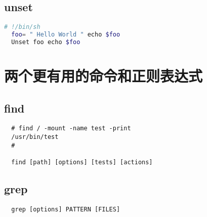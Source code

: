 \documentclass[a4paper]{ctexart}
\begin{document}
\subsection{unset}
\begin{lstlisting}[language=sh]
  # !/bin/sh 
  foo= " Hello World " echo $foo 
  Unset foo echo $foo   
\end{lstlisting}

\section{两个更有用的命令和正则表达式}
\subsection{find}
\begin{lstlisting}
  # find / -mount -name test -print
  /usr/bin/test
  #

  find [path] [options] [tests] [actions]
\end{lstlisting}

\subsection{grep}
\begin{lstlisting}
  grep [options] PATTERN [FILES]
\end{lstlisting}




\end{document}
